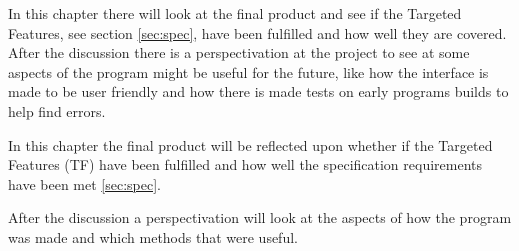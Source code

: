 In this chapter there will look at the final product and see if the Targeted Features, see section \ref{sec:spec}, have been fulfilled and how well they are covered. After the discussion there is a perspectivation at the project to see at some aspects of the program might be useful for the future, like how the interface is made to be user friendly and how there is made tests on early programs builds to help find errors.

In this chapter the final product will be reflected upon whether if the Targeted Features (TF) have been fulfilled and how well the specification requirements have been met \ref{sec:spec}.

After the discussion a perspectivation will look at the aspects of how the program was made and which methods that were useful. 